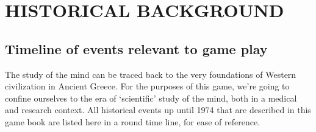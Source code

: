 \pagebreak 

\chapter{HISTORICAL BACKGROUND}
\label{historicalbackground}

\section{Timeline of events relevant to game play}
\label{timelineofeventsrelevanttogameplay}

The study of the mind can be traced back to the very foundations of Western civilization in Ancient Greece. For the purposes of this game, we're going to confine ourselves to the era of `scientific' study of the mind, both in a medical and research context. All historical events up until 1974 that are described in this game book are listed here in a round time line, for ease of reference.

